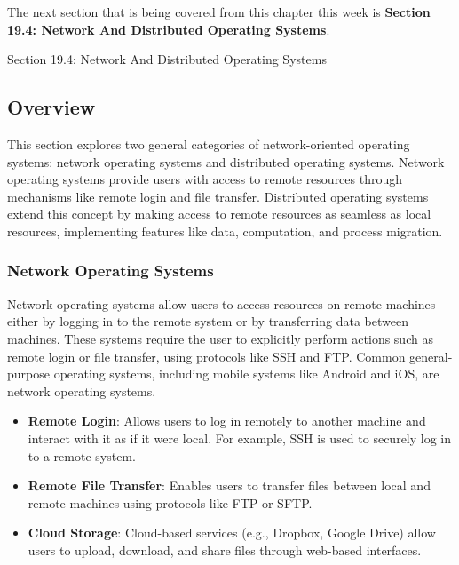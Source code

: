 The next section that is being covered from this chapter this week is \textbf{Section 19.4: Network And Distributed Operating Systems}.

\begin{notes}{Section 19.4: Network And Distributed Operating Systems}
    \subsection*{Overview}

    This section explores two general categories of network-oriented operating systems: network operating systems and distributed operating systems. Network operating systems provide users with access 
    to remote resources through mechanisms like remote login and file transfer. Distributed operating systems extend this concept by making access to remote resources as seamless as local resources, 
    implementing features like data, computation, and process migration.
    
    \subsubsection*{Network Operating Systems}
    
    Network operating systems allow users to access resources on remote machines either by logging in to the remote system or by transferring data between machines. These systems require the user to 
    explicitly perform actions such as remote login or file transfer, using protocols like SSH and FTP. Common general-purpose operating systems, including mobile systems like Android and iOS, are 
    network operating systems.
    
    \begin{highlight}
    
        \begin{itemize}
            \item \textbf{Remote Login}: Allows users to log in remotely to another machine and interact with it as if it were local. For example, SSH is used to securely log in to a remote system.
            \item \textbf{Remote File Transfer}: Enables users to transfer files between local and remote machines using protocols like FTP or SFTP.
            \item \textbf{Cloud Storage}: Cloud-based services (e.g., Dropbox, Google Drive) allow users to upload, download, and share files through web-based interfaces.
        \end{itemize}
    

\end{highlight}
\end{notes}
